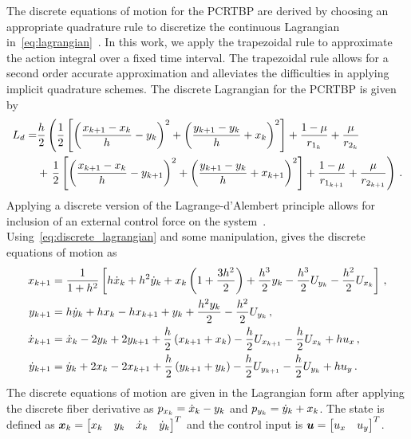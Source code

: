 \documentclass[smallcondensed]{svjour3}
\begin{document}
The discrete equations of motion for the PCRTBP are derived by choosing an appropriate quadrature rule to discretize the continuous Lagrangian in~\cref{eq:lagrangian}~\cite{marsden2001}.
In this work, we apply the trapezoidal rule to approximate the action integral over a fixed time interval.
The trapezoidal rule allows for a second order accurate approximation and alleviates the difficulties in applying implicit quadrature schemes.
The discrete Lagrangian for the PCRTBP is given by
\begin{align}\label{eq:discrete_lagrangian}
        L_d = &\frac{h}{2} \left( \frac{1}{2} \left[ \left(  \frac{x_{k+1} - x_k}{h} -y_{k} \right)^2 + \left( \frac{y_{k+1} - y_{k}}{h} + x_k \right)^2 \right] + \frac{1 - \mu}{r_{1_k}} + \frac{\mu}{r_{2_k}} \right. \nonumber \\ 
                & + \left. \frac{1}{2} \left[ \left(  \frac{x_{k+1} - x_k}{h} -y_{k+1} \right)^2 + \left( \frac{y_{k+1} - y_{k}}{h} + x_{k+1} \right)^2 \right] + \frac{1-\mu}{r_{1_{k+1}}} + \frac{\mu}{r_{2_{k+1}}}  \right) \, .
\end{align}
Applying a discrete version of the Lagrange-d'Alembert principle allows for inclusion of an external control force on the system~\cite{marsden2001}.
Using~\cref{eq:discrete_lagrangian} and some manipulation, gives the discrete equations of motion as
\begin{subequations}\label{eq:discrete_eoms}
\begin{align}
        x_{k+1} &= \frac{1}{1+ h^2} \left[ h \dot{x}_k + h^2 \dot{y}_k  + x_k \left( 1+ \frac{3h^2}{2} \right) + \frac{h^3}{2} y_{k} - \frac{h^3}{2} U_{y_k} - \frac{h^2}{2} U_{x_k}  \right] \label{eq:xkp} \, ,\\
        y_{k+1} &= h \dot{y}_k + h x_k - h x_{k+1} + y_{k} + \frac{h^2 y_{k}}{2} - \frac{h^2 }{2} U_{y_k} \label{eq:ykp} \, ,\\
        \dot{x}_{k+1} &= \dot{x}_k - 2 y_{k} + 2 y_{k+1} + \frac{h}{2} \left( x_{k+1} + x_k \right) - \frac{h}{2} U_{x_{k+1}} - \frac{h}{2} U_{x_k} + h u_x \label{eq:xdotkp}\, ,\\
        \dot{y}_{k+1} &= \dot{y}_{k} + 2 x_k - 2 x_{k+1} + \frac{h}{2} \left( y_{k+1} + y_{k} \right) - \frac{h}{2} U_{y_{k+1}} - \frac{h}{2} U_{y_{k}} + h u_y \label{eq:ydotkp} \, .
\end{align}
\end{subequations}
The discrete equations of motion are given in the Lagrangian form after applying the discrete fiber derivative as \( p_{x_k} = \dot{x}_k - y_{k} \) and \( p_{y_{k}} = \dot{y}_k + x_k \).
The state is defined as \( \bm{x}_k = \begin{bmatrix} x_k & y_{k} & \dot{x}_k & \dot{y}_k \end{bmatrix}^T\) and the control input is \( \bm{u} = \begin{bmatrix} u_x & u_y \end{bmatrix}^T \).
\end{document}
